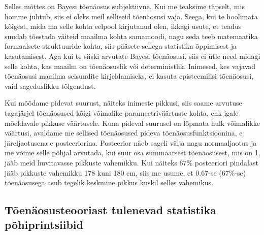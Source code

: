 \documentclass[]{book}
\begin{document}
Selles mõttes on Bayesi tõenäosus subjektiivne. Kui me teaksime täpselt,
mis homme juhtub, siis ei oleks meil selliseid tõenäosusi vaja. Seega,
kui te hoolimata kõigest, mida ma selle kohta eelpool kirjutanud olen,
ikkagi usute, et teadus suudab tõestada väiteid maailma kohta samamoodi,
nagu seda teeb matemaatika formaalsete struktuuride kohta, siis pääsete
sellega statistika õppimisest ja kasutamisest. Aga kui te siiski
arvutate Bayesi tõenäosusi, siis ei ütle need midagi selle kohta, kas
maailm on tõenäosuslik või deterministlik. Inimesed, kes vajavad
tõenäosusi maailma seisundite kirjeldamiseks, ei kasuta episteemilisi
tõenäosusi, vaid sageduslikku tõlgendust.

Kui mõõdame pidevat suurust, näiteks inimeste pikkusi, siis saame
arvutuse tagajärjel tõenäosused kõigi võimalike parameetriväärtuste
kohta, ehk igale mõeldavale pikkuse väärtusele. Kuna pideval suurusel on
lõpmata hulk võimalikke väärtusi, avaldame me sellised tõenäosused
pideva tõenäosusfunktsioonina, e järeljaotusena e posteeriorina.
Posteerior näeb sageli välja nagu normaaljaotus ja me võime selle põhjal
arvutada, kui suur osa summaarsest tõenäosusest, mis on 1, jääb meid
huvitavasse pikkuste vahemikku. Kui näiteks 67\% posteeriori pindalast
jääb pikkuste vahemikku 178 kuni 180 cm, siis me usume, et 0.67-se
(67\%-se) tõenäosusega asub tegelik keskmine pikkus kuskil selles
vahemikus.

\subsection*{Tõenäosusteooriast tulenevad statistika
põhiprintsiibid}\label{toenaosusteooriast-tulenevad-statistika-pohiprintsiibid}
\end{document}
